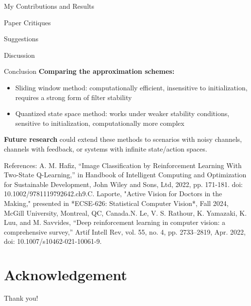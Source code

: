 \documentclass[14pt]{beamer}
\begin{document}
\begin{frame}{My Contributions and Results}
\end{frame}
\begin{frame}{Paper Critiques}
\end{frame}
\begin{frame}{Suggestions}
\end{frame}
\begin{frame}{Discussion}
\end{frame}
\begin{frame}{Conclusion}
\textbf{Comparing the approximation schemes:}
    \begin{itemize}
        \item Sliding window method: computationally efficient, insensitive to initialization, requires a strong form of filter stability
        
        \item Quantized state space method: works under weaker stability conditions, sensitive to initialization, computationally more complex\newline\newline
    \end{itemize}
\textbf{Future research} could extend these methods to scenarios with noisy channels, channels with feedback, or systems with infinite state/action spaces.
\end{frame}
\begin{frame}{References:}
\fontsize{8pt}{7.2}\selectfont
[1]	A. M. Hafiz, “Image Classification by Reinforcement Learning With Two-State Q-Learning,” in Handbook of Intelligent Computing and Optimization for Sustainable Development, John Wiley and Sons, Ltd, 2022, pp. 171-181. doi: 10.1002/9781119792642.ch9.\newline
[2] C. Laporte, "Active Vision for Doctors in the Making," presented in *ECSE-626: Statistical Computer Vision*, Fall 2024, McGill University, Montreal, QC, Canada.\newline
[3]	N. Le, V. S. Rathour, K. Yamazaki, K. Luu, and M. Savvides, “Deep reinforcement learning in computer vision: a comprehensive survey,” Artif Intell Rev, vol. 55, no. 4, pp. 2733–2819, Apr. 2022, doi: 10.1007/s10462-021-10061-9.

\end{frame}

\section*{Acknowledgement}  
\begin{frame}
\textcolor{myNewColorA}{\Huge{\centerline{Thank you!}}}
\end{frame}
\end{document}
